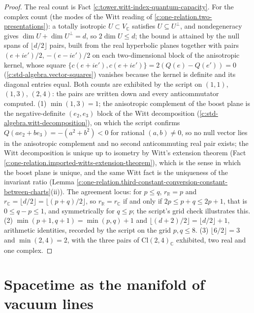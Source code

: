 \documentclass[11pt]{article}
\theoremstyle{definition}
\theoremstyle{plain}
\providecommand{\C}{}\renewcommand{\C}{\mathbb{C}}
\providecommand{\Cl}{}\renewcommand{\Cl}{\mathrm{Cl}}
\providecommand{\R}{}\renewcommand{\R}{\mathbb{R}}
\begin{document}
\begin{proof}
The real count is Fact \ref{c:tower.witt-index-quantum-capacity}. For the complex count (the modes of the Witt reading of \ref{c:one-relation.two-presentations}): a totally isotropic $U \subset V_{\C}$ satisfies $U \subseteq U^{\perp}$, and nondegeneracy gives $\dim U + \dim U^{\perp} = d$, so $2\dim U \leq d$; the bound is attained by the null spans of $\lfloor d/2 \rfloor$ pairs, built from the real hyperbolic planes together with pairs $(e + ie')/2$, $-(e - ie')/2$ on each two-dimensional block of the anisotropic kernel, whose square $\{c(e+ie'), c(e+ie')\} = 2(Q(e) - Q(e')) = 0$ (\ref{c:std-algebra.vector-squares}) vanishes because the kernel is definite and its diagonal entries equal. Both counts are exhibited by the script on $(1,1)$, $(1,3)$, $(2,4)$: the pairs are written down and every anticommutator computed. (1) $\min(1,3) = 1$; the anisotropic complement of the boost plane is the negative-definite $(e_{2}, e_{3})$ block of the Witt decomposition (\ref{c:std-algebra.witt-decomposition}), on which the script confirms $Q(ae_{2} + be_{3}) = -(a^{2} + b^{2}) < 0$ for rational $(a,b) \neq 0$, so no null vector lies in the anisotropic complement and no second anticommuting real pair exists; the Witt decomposition is unique up to isometry by Witt's extension theorem (Fact \ref{c:one-relation.imported-witts-extension-theorem}), which is the sense in which the boost plane is unique, and the same Witt fact is the uniqueness of the invariant ratio (Lemma \ref{c:one-relation.third-constant-conversion-constant-between-charts}(ii)). The agreement locus: for $p \leq q$, $r_{\R} = p$ and $r_{\C} = \lfloor d/2 \rfloor = \lfloor (p+q)/2 \rfloor$, so $r_{\R} = r_{\C}$ if and only if $2p \leq p + q \leq 2p + 1$, that is $0 \leq q - p \leq 1$, and symmetrically for $q \leq p$; the script's grid check illustrates this. (2) $\min(p+1,q+1) = \min(p,q) + 1$ and $\lfloor (d+2)/2 \rfloor = \lfloor d/2 \rfloor + 1$, arithmetic identities, recorded by the script on the grid $p, q \leq 8$. (3) $\lfloor 6/2 \rfloor = 3$ and $\min(2,4) = 2$, with the three pairs of $\Cl(2,4)_{\C}$ exhibited, two real and one complex.

\end{proof}

\section{Spacetime as the manifold of vacuum lines}
\end{document}
